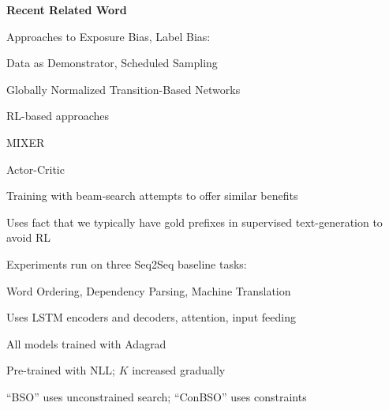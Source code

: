 \documentclass{beamer}
\let\tempone\itemize
\let\temptwo\enditemize
\renewenvironment{itemize}{\tempone\addtolength{\itemsep}{0.5\baselineskip}}{\temptwo}
\newcommand{\air}{\vspace{0.25cm}}
\begin{document}
 \begin{frame}
   \begin{center}
     \textbf{Recent Related Word}
   \end{center}
   \begin{itemize}
   \item Approaches to Exposure Bias, Label Bias:
  \begin{itemize}
  \item Data as Demonstrator, Scheduled Sampling \citep{Venkatraman,bengio15scheduled}
  \item Globally Normalized Transition-Based Networks \citep{Andor2016}
  \end{itemize}
  \air
  \item RL-based approaches
  \begin{itemize}
  \item MIXER \citep{ranzato16sequence}
  \item Actor-Critic \citep{Bahdanau2016}
  \end{itemize}
  \air
  \item Training with beam-search attempts to offer similar benefits
  \begin{itemize}
  \item Uses fact that we typically have gold prefixes in supervised text-generation to avoid RL
\end{itemize}   
\end{itemize}

 \end{frame}


\begin{frame}

  Experiments run on three Seq2Seq baseline tasks:

  \begin{itemize}
  \item Word Ordering, Dependency Parsing, Machine Translation
  \end{itemize}
  
\air
\air

\begin{itemize}
\item Uses LSTM encoders and decoders, attention, input feeding
\item All models trained with Adagrad~\citep{duchi2011adaptive}
\item Pre-trained with NLL; $K$ increased gradually
\item ``BSO'' uses unconstrained search; ``ConBSO'' uses constraints
\end{itemize} 
 
\end{frame}
\end{document}
